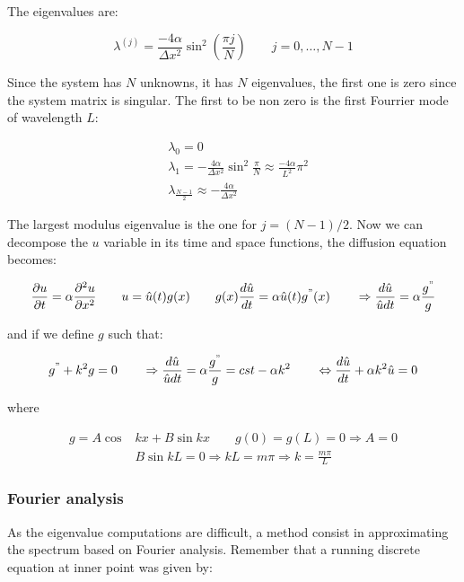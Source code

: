 The eigenvalues are: 

\begin{equation}
\lambda ^{(j)} = \frac{-4\alpha}{\Delta x^2}\sin ^2 \left( \frac{\pi j}{N} \right) \qquad j = 0, \dots, N-1
\end{equation}

Since the system has $N$ unknowns, it has $N$ eigenvalues, the first one is zero since the system matrix is singular. The first to be non zero is the first Fourrier mode of wavelength $L$: 

\begin{equation}
\begin{aligned}
&\lambda _{0} = 0\\
&\lambda _{1} = -\frac{4\alpha}{\Delta x^2} \sin ^2 \frac{\pi }{ N}\approx\frac{-4 \alpha}{L^2}\pi ^2\\
&\lambda _{\frac{N-1}{2}} \approx -\frac{4\alpha}{\Delta x^2}
\end{aligned}
\end{equation}

The largest modulus eigenvalue is the one for $j = (N-1)/2$. Now we can decompose the $u$ variable in its time and space functions, the diffusion equation becomes: 

\begin{equation}
\frac{\partial u}{\partial t} = \alpha \frac{\partial ^2 u}{\partial x^2} \qquad u = \hat{u}(t)g(x) \qquad g(x) \frac{d \hat{u}}{d t} = \alpha \hat{u}(t)g^"(x)\qquad
\Rightarrow \frac{d\hat{u}}{\hat{u}dt} = \alpha \frac{g^"}{g} 
\end{equation}

and if we define $g$ such that: 

\begin{equation}
g^" + k^2 g = 0 \qquad
\Rightarrow  \frac{d\hat{u}}{\hat{u}dt} = \alpha \frac{g^"}{g}= cst - \alpha k^2 \qquad \Leftrightarrow \frac{d \hat{u}}{dt} + \alpha k^2 \hat{u} = 0
\end{equation}

where 

\begin{equation}
\begin{aligned}
g = A \cos &k x + B \sin kx \qquad g(0) = g(L) = 0 \Rightarrow A = 0 \\ 
&B\sin kL = 0 \Rightarrow kL = m \pi \Rightarrow k = \frac{m\pi}{L}
\end{aligned}
\end{equation}

\subsubsection{Fourier analysis}
As the eigenvalue computations are difficult, a method consist in approximating the spectrum based on Fourier analysis. Remember that a running discrete equation at inner point was given by: 

